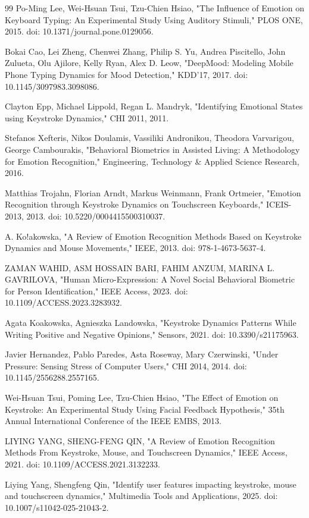 \documentclass[conference]{IEEEtran}
\begin{document}
\begin{thebibliography}{99}
Po-Ming Lee, Wei-Hsuan Tsui, Tzu-Chien Hsiao, "The Influence of Emotion on Keyboard Typing: An Experimental Study Using Auditory Stimuli," PLOS ONE, 2015. doi: 10.1371/journal.pone.0129056.

Bokai Cao, Lei Zheng, Chenwei Zhang, Philip S. Yu, Andrea Piscitello, John Zulueta, Olu Ajilore, Kelly Ryan, Alex D. Leow, "DeepMood: Modeling Mobile Phone Typing Dynamics for Mood Detection," KDD'17, 2017. doi: 10.1145/3097983.3098086.

Clayton Epp, Michael Lippold, Regan L. Mandryk, "Identifying Emotional States using Keystroke Dynamics," CHI 2011, 2011.

Stefanos Xefteris, Nikos Doulamis, Vassiliki Andronikou, Theodora Varvarigou, George Cambourakis, "Behavioral Biometrics in Assisted Living: A Methodology for Emotion Recognition," Engineering, Technology \& Applied Science Research, 2016.

Matthias Trojahn, Florian Arndt, Markus Weinmann, Frank Ortmeier, "Emotion Recognition through Keystroke Dynamics on Touchscreen Keyboards," ICEIS-2013, 2013. doi: 10.5220/0004415500310037.

A. Ko!akowska, "A Review of Emotion Recognition Methods Based on Keystroke Dynamics and Mouse Movements," IEEE, 2013. doi: 978-1-4673-5637-4.

ZAMAN WAHID, ASM HOSSAIN BARI, FAHIM ANZUM, MARINA L. GAVRILOVA, "Human Micro-Expression: A Novel Social Behavioral Biometric for Person Identification," IEEE Access, 2023. doi: 10.1109/ACCESS.2023.3283932.

Agata Koakowska, Agnieszka Landowska, "Keystroke Dynamics Patterns While Writing Positive and Negative Opinions," Sensors, 2021. doi: 10.3390/s21175963.

Javier Hernandez, Pablo Paredes, Asta Roseway, Mary Czerwinski, "Under Pressure: Sensing Stress of Computer Users," CHI 2014, 2014. doi: 10.1145/2556288.2557165.

Wei-Hsuan Tsui, Poming Lee, Tzu-Chien Hsiao, "The Effect of Emotion on Keystroke: An Experimental Study Using Facial Feedback Hypothesis," 35th Annual International Conference of the IEEE EMBS, 2013.

LIYING YANG, SHENG-FENG QIN, "A Review of Emotion Recognition Methods From Keystroke, Mouse, and Touchscreen Dynamics," IEEE Access, 2021. doi: 10.1109/ACCESS.2021.3132233.

Liying Yang, Shengfeng Qin, "Identify user features impacting keystroke, mouse and touchscreen dynamics," Multimedia Tools and Applications, 2025. doi: 10.1007/s11042-025-21043-2.

\end{thebibliography}
\end{document}
